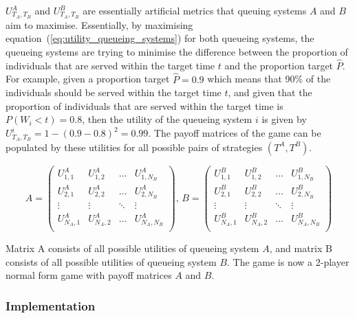 \(U_{T_A, T_B}^A\) and \(U_{T_A, T_B}^B\) are essentially artificial metrics
that queuing systems \(A\) and \(B\) aim to maximise.
Essentially, by maximising equation~(\ref{eq:utility_queueing_systems}) for both
queueing systems, the queueing systems are trying to minimise the difference
between the proportion of individuals that are served within the target time
\(t\) and the proportion target \(\hat{P}\).
For example, given a proportion target \(\hat{P} = 0.9\) which means that
90\% of the individuals should be served within the target time \(t\), and
given that the proportion of individuals that are served within the target time
is \(P(W_i < t) = 0.8\), then the utility of the queueing system \(i\) is
given by \(U_{T_A, T_B}^i = 1 - (0.9 - 0.8)^2 = 0.99\).
The payoff matrices of the game can be populated by these utilities for all
possible pairs of strategies \((T^A, T^B)\).

\begin{equation}\label{eq:payoff_matrices}
    A =
    \begin{pmatrix}
        U_{1,1}^A & U_{1,2}^A & \dots & U_{1,N_B}^A \\
        U_{2,1}^A & U_{2,2}^A & \dots & U_{2,N_B}^A \\
        \vdots & \vdots & \ddots & \vdots \\
        U_{N_A,1}^A & U_{N_A,2}^A & \dots & U_{N_A,N_B}^A \\
    \end{pmatrix}, \,
    B =
    \begin{pmatrix}
        U_{1,1}^B & U_{1,2}^B & \dots & U_{1,N_B}^B \\
        U_{2,1}^B & U_{2,2}^B & \dots & U_{2,N_B}^B \\
        \vdots & \vdots & \ddots & \vdots \\
        U_{N_A,1}^B & U_{N_A,2}^B & \dots & U_{N_A,N_B}^B \\
    \end{pmatrix}
\end{equation}

Matrix A consists of all possible utilities of queueing system \(A\), and
matrix B consists of all possible utilities of queueing system \(B\).
The game is now a 2-player normal form game with payoff matrices \(A\) and
\(B\).


\subsubsection{Implementation}

